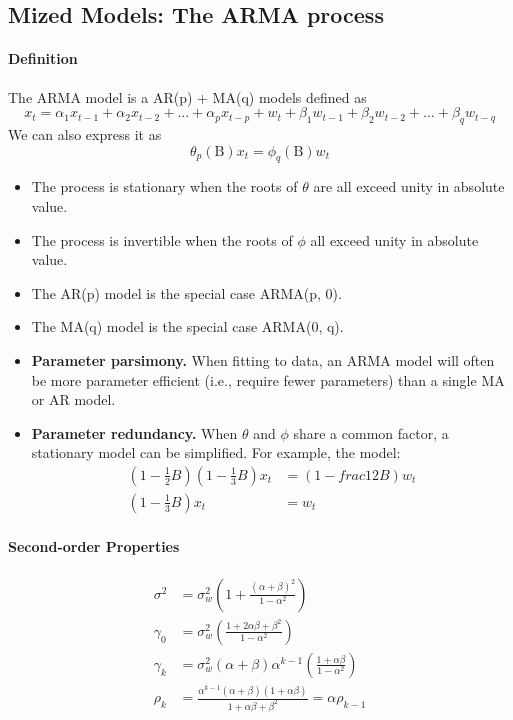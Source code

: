 \subsection{Mized Models: The ARMA process}

\paragraph{Definition}
The ARMA model is a AR(p) + MA(q) models defined as
\[ x_t = \alpha_1 x_{t-1} + \alpha_2 x_{t-2} + ... + \alpha_p x_{t-p} + w_t + \beta_1 w_{t-1} + \beta_2 w_{t-2} + ... + \beta_q w_{t-q} \]
We can also express it as 
\[ \theta_p(\mathrm{B}) x_t = \phi_q(\mathrm{B}) w_t \]
\begin{itemize}
    \item[\textbullet] The process is stationary when the roots of $\theta$ are all exceed unity in absolute value.
    \item[\textbullet] The process is invertible when the roots of $\phi$ all exceed unity in absolute value.
    \item[\textbullet] The AR(p) model is the special case ARMA(p, 0).
    \item[\textbullet] The MA(q) model is the special case ARMA(0, q).
    \item[\textbullet] \textbf{Parameter parsimony.} When fitting to data, an ARMA model will often be more parameter efficient (i.e., require fewer parameters) than a single MA or AR model.
    \item[\textbullet] \textbf{Parameter redundancy.} When $\theta$ and $\phi$ share a common factor, a stationary model can be simplified. For example, the model:
        \begin{align*}
            (1 - \frac{1}{2}B)(1 - \frac{1}{3}B)x_t &= (1 - frac{1}{2}B)w_t \\
            (1 - \frac{1}{3}B)x_t &= w_t
        \end{align*}
\end{itemize}

\paragraph{Second-order Properties}
\begin{align*}
    \sigma^2 &= \sigma_w^2 \left( 1 + \frac{(\alpha+\beta)^2}{1 - \alpha^2} \right) \\
    \gamma_0 &= \sigma_w^2 \left( \frac{1 + 2 \alpha \beta + \beta^2}{1 - \alpha^2} \right) \\
    \gamma_k &= \sigma_w^2 (\alpha + \beta)\alpha^{k-1} \left( \frac{1 + \alpha \beta}{1 - \alpha^2} \right) \\
    \rho_k &= \frac{\alpha^{k-1}(\alpha+\beta)(1+\alpha\beta)}{1 + \alpha\beta + \beta^2} = \alpha \rho_{k-1}
\end{align*}

